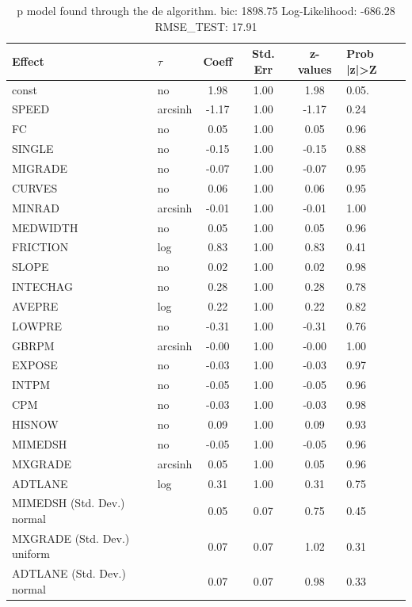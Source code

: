 \begin{table}
	\caption{p model found through the de algorithm. bic: 1898.75 Log-Likelihood: -686.28 RMSE_TEST: 17.91}
	\begin{center}
		\begin{tabular}{|l|l|c|c|c|l|}
			\hline
			Effect & $\tau$ & Coeff & Std. Err & z-values & Prob |z|>Z \\
			\hline
			const & no & 1.98 & 1.00 & 1.98 & 0.05. \\
			\hline
			SPEED & arcsinh & -1.17 & 1.00 & -1.17 & 0.24 \\
			\hline
			FC & no & 0.05 & 1.00 & 0.05 & 0.96 \\
			\hline
			SINGLE & no & -0.15 & 1.00 & -0.15 & 0.88 \\
			\hline
			MIGRADE & no & -0.07 & 1.00 & -0.07 & 0.95 \\
			\hline
			CURVES & no & 0.06 & 1.00 & 0.06 & 0.95 \\
			\hline
			MINRAD & arcsinh & -0.01 & 1.00 & -0.01 & 1.00 \\
			\hline
			MEDWIDTH & no & 0.05 & 1.00 & 0.05 & 0.96 \\
			\hline
			FRICTION & log & 0.83 & 1.00 & 0.83 & 0.41 \\
			\hline
			SLOPE & no & 0.02 & 1.00 & 0.02 & 0.98 \\
			\hline
			INTECHAG & no & 0.28 & 1.00 & 0.28 & 0.78 \\
			\hline
			AVEPRE & log & 0.22 & 1.00 & 0.22 & 0.82 \\
			\hline
			LOWPRE & no & -0.31 & 1.00 & -0.31 & 0.76 \\
			\hline
			GBRPM & arcsinh & -0.00 & 1.00 & -0.00 & 1.00 \\
			\hline
			EXPOSE & no & -0.03 & 1.00 & -0.03 & 0.97 \\
			\hline
			INTPM & no & -0.05 & 1.00 & -0.05 & 0.96 \\
			\hline
			CPM & no & -0.03 & 1.00 & -0.03 & 0.98 \\
			\hline
			HISNOW & no & 0.09 & 1.00 & 0.09 & 0.93 \\
			\hline
			MIMEDSH & no & -0.05 & 1.00 & -0.05 & 0.96 \\
			\hline
			MXGRADE & arcsinh & 0.05 & 1.00 & 0.05 & 0.96 \\
			\hline
			ADTLANE & log & 0.31 & 1.00 & 0.31 & 0.75 \\
			\hline
			MIMEDSH (Std. Dev.) normal &  & 0.05 & 0.07 & 0.75 & 0.45 \\
			\hline
			MXGRADE (Std. Dev.) uniform &  & 0.07 & 0.07 & 1.02 & 0.31 \\
			\hline
			ADTLANE (Std. Dev.) normal &  & 0.07 & 0.07 & 0.98 & 0.33 \\
			\hline
		\end{tabular}
	\end{center}
\end{table}